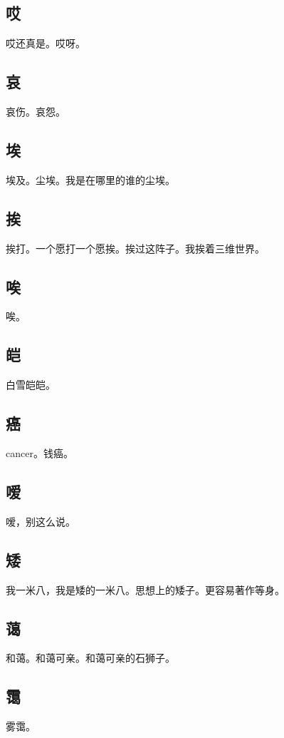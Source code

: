 \documentclass[UTF8]{oneHumanIndex}
\begin{document}
\subsection{哎}
哎还真是。哎呀。

\subsection{哀}
哀伤。哀怨。

\subsection{埃}
埃及。尘埃。我是在哪里的谁的尘埃。

\subsection{挨}
挨打。一个愿打一个愿挨。挨过这阵子。我挨着三维世界。

\subsection{唉}
唉。

\subsection{皑}
白雪皑皑。

\subsection{癌}
cancer。钱癌。

\subsection{嗳}
嗳，别这么说。

\subsection{矮}
我一米八，我是矮的一米八。思想上的矮子。更容易著作等身。

\subsection{蔼}
和蔼。和蔼可亲。和蔼可亲的石狮子。

\subsection{霭}
雾霭。
\end{document}
